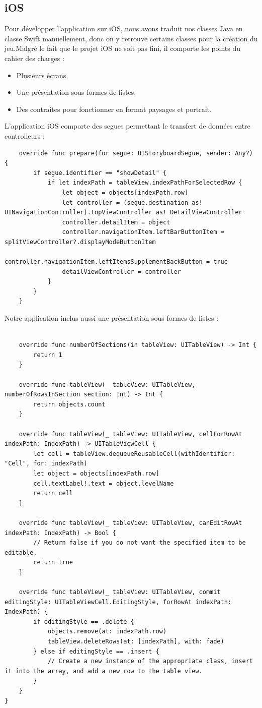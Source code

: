 \documentclass{article}
\begin{document}
\subsection{iOS}
Pour développer l'application sur iOS, nous avons traduit nos classes Java en classe Swift manuellement, donc on y retrouve certains classes pour la création du jeu.Malgré le fait que le projet iOS ne soit pas fini, il comporte les points du cahier des charges :
\begin{itemize}
    \item Plusieurs écrans.
    \item Une présentation sous formes de listes.
    \item Des contraites pour fonctionner en format paysages et portrait.
\end{itemize}
L'application iOS comporte des segues permettant le transfert de données entre controlleurs :
\begin{verbatim}
    override func prepare(for segue: UIStoryboardSegue, sender: Any?) {
        if segue.identifier == "showDetail" {
            if let indexPath = tableView.indexPathForSelectedRow {
                let object = objects[indexPath.row]
                let controller = (segue.destination as! UINavigationController).topViewController as! DetailViewController
                controller.detailItem = object
                controller.navigationItem.leftBarButtonItem = splitViewController?.displayModeButtonItem
                controller.navigationItem.leftItemsSupplementBackButton = true
                detailViewController = controller
            }
        }
    }
\end{verbatim}
Notre application inclus aussi une présentation sous formes de listes :
\begin{verbatim}
    
    override func numberOfSections(in tableView: UITableView) -> Int {
        return 1
    }

    override func tableView(_ tableView: UITableView, numberOfRowsInSection section: Int) -> Int {
        return objects.count
    }

    override func tableView(_ tableView: UITableView, cellForRowAt indexPath: IndexPath) -> UITableViewCell {
        let cell = tableView.dequeueReusableCell(withIdentifier: "Cell", for: indexPath)
        let object = objects[indexPath.row]
        cell.textLabel!.text = object.levelName
        return cell
    }

    override func tableView(_ tableView: UITableView, canEditRowAt indexPath: IndexPath) -> Bool {
        // Return false if you do not want the specified item to be editable.
        return true
    }

    override func tableView(_ tableView: UITableView, commit editingStyle: UITableViewCell.EditingStyle, forRowAt indexPath: IndexPath) {
        if editingStyle == .delete {
            objects.remove(at: indexPath.row)
            tableView.deleteRows(at: [indexPath], with: fade)
        } else if editingStyle == .insert {
            // Create a new instance of the appropriate class, insert it into the array, and add a new row to the table view.
        }
    }
}
\end{verbatim}
\end{document}

